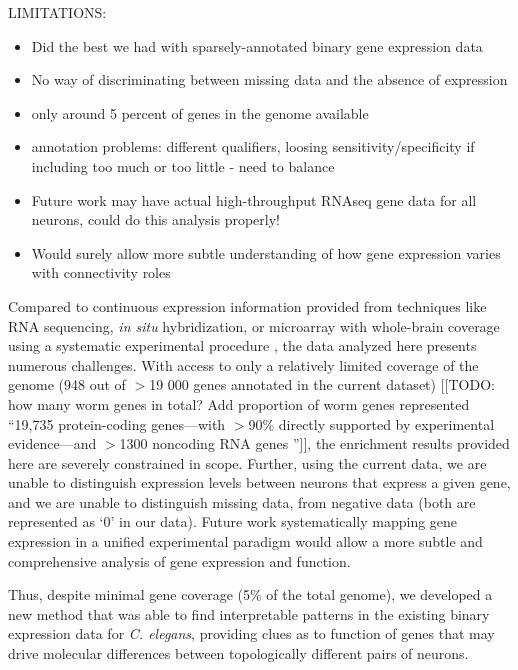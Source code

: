 \documentclass[10pt,letterpaper]{article}
\begin{document}
LIMITATIONS:
\begin{itemize}
    \item Did the best we had with sparsely-annotated binary gene expression data
    \item No way of discriminating between missing data and the absence of expression
    \item only around 5 percent of genes in the genome available
    \item annotation problems: different qualifiers, loosing sensitivity/specificity if including too much or too little - need to balance
    \item Future work may have actual high-throughput RNAseq gene data for all neurons, could do this analysis properly!
    \item Would surely allow more subtle understanding of how gene expression varies with connectivity roles
\end{itemize}

Compared to continuous expression information provided from techniques like RNA sequencing, \emph{in situ} hybridization, or microarray with whole-brain coverage using a systematic experimental procedure \cite{Lein:2007jn, Shen:2012ua, Tasic:2016jp}, the data analyzed here presents numerous challenges.
With access to only a relatively limited coverage of the genome (948 out of $>$19 000 genes \cite{Hillier2005} annotated in the current dataset) [[TODO: how many worm genes in total? Add proportion of worm genes represented ``19,735 protein-coding genes—with $>$90\% directly supported by experimental evidence—and $>$1300 noncoding RNA genes \cite{Hillier2005}'']], the enrichment results provided here are severely constrained in scope.
Further, using the current data, we are unable to distinguish expression levels between neurons that express a given gene, and we are unable to distinguish missing data, from negative data (both are represented as `0' in our data).
Future work systematically mapping gene expression in a unified experimental paradigm would allow a more subtle and comprehensive analysis of gene expression and function.

Thus, despite minimal gene coverage (5\% of the total genome), we developed a new method that was able to find interpretable patterns in the existing binary expression data for \emph{C. elegans}, providing clues as to function of genes that may drive molecular differences between topologically different pairs of neurons.
\end{document}
